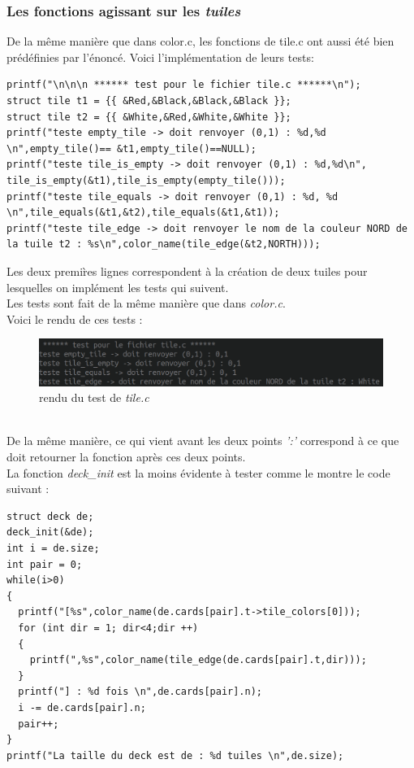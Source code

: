 \documentclass[12pt,a4paper]{extarticle}
\begin{document}
     \subsubsection{Les fonctions agissant sur les \emph{tuiles}}
     De la m\^eme mani\`ere que dans color.c, les fonctions de tile.c ont aussi \'et\'e bien pr\'ed\'efinies
     par l'\'enonc\'e.
     Voici l'impl\'ementation de leurs tests:
     \begin{lstlisting}[style=CStyle]
printf("\n\n\n ****** test pour le fichier tile.c ******\n");
struct tile t1 = {{ &Red,&Black,&Black,&Black }};
struct tile t2 = {{ &White,&Red,&White,&White }};
printf("teste empty_tile -> doit renvoyer (0,1) : %d,%d \n",empty_tile()== &t1,empty_tile()==NULL);
printf("teste tile_is_empty -> doit renvoyer (0,1) : %d,%d\n", tile_is_empty(&t1),tile_is_empty(empty_tile()));
printf("teste tile_equals -> doit renvoyer (0,1) : %d, %d \n",tile_equals(&t1,&t2),tile_equals(&t1,&t1)); 
printf("teste tile_edge -> doit renvoyer le nom de la couleur NORD de la tuile t2 : %s\n",color_name(tile_edge(&t2,NORTH)));
     \end{lstlisting}
    Les deux premi\`res lignes correspondent \`a la cr\'eation de deux tuiles pour lesquelles
    on impl\'ement les tests qui suivent.\\
    Les tests sont fait de la m\^eme mani\`ere que dans \emph{color.c}.\\
    Voici le rendu de ces tests : 
    \begin{figure}[h!]
        \centering
        \includegraphics[width=15cm]{img/tilec}
        \caption{rendu du test de \emph{tile.c}}
    \end{figure}
    \\
    De la m\^eme mani\`ere, ce qui vient avant les deux points \emph{':'} correspond \`a ce que doit retourner la fonction
    apr\`es ces deux points.\\
    La fonction \emph{deck\_init} est la moins \'evidente \`a tester 
    comme le montre le code suivant : 
    \begin{lstlisting}[style=CStyle]
struct deck de;
deck_init(&de);
int i = de.size;
int pair = 0;
while(i>0)
{
  printf("[%s",color_name(de.cards[pair].t->tile_colors[0]));
  for (int dir = 1; dir<4;dir ++)
  {
    printf(",%s",color_name(tile_edge(de.cards[pair].t,dir)));
  }
  printf("] : %d fois \n",de.cards[pair].n);
  i -= de.cards[pair].n;
  pair++;
}
printf("La taille du deck est de : %d tuiles \n",de.size);
    \end{lstlisting}
\end{document}
